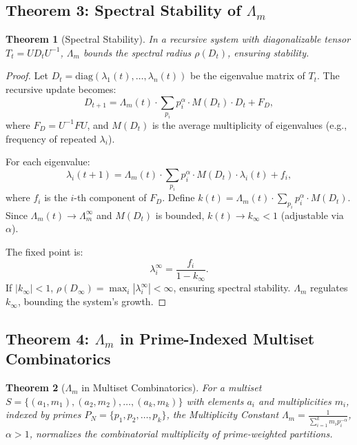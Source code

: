 \documentclass{article}
\theoremstyle{plain}
\newtheorem{theorem}{Theorem}
\begin{document}
\subsection{Theorem 3: Spectral Stability of \(\Lambda_m\)}
\begin{theorem}[Spectral Stability]
In a recursive system with diagonalizable tensor \( T_t = U D_t U^{-1} \), \(\Lambda_m\) bounds the spectral radius \(\rho(D_t)\), ensuring stability.
\end{theorem}

\begin{proof}
Let \( D_t = \text{diag}(\lambda_1(t), \ldots, \lambda_n(t)) \) be the eigenvalue matrix of \( T_t \). The recursive update becomes:
\[
D_{t+1} = \Lambda_m(t) \cdot \sum_{p_i} p_i^\alpha \cdot M(D_t) \cdot D_t + F_D,
\]
where \( F_D = U^{-1} F U \), and \( M(D_t) \) is the average multiplicity of eigenvalues (e.g., frequency of repeated \(\lambda_i\)).

For each eigenvalue:
\[
\lambda_i(t+1) = \Lambda_m(t) \cdot \sum_{p_i} p_i^\alpha \cdot M(D_t) \cdot \lambda_i(t) + f_i,
\]
where \( f_i \) is the \( i \)-th component of \( F_D \). Define \( k(t) = \Lambda_m(t) \cdot \sum_{p_i} p_i^\alpha \cdot M(D_t) \). Since \( \Lambda_m(t) \to \Lambda_m^\infty \) and \( M(D_t) \) is bounded, \( k(t) \to k_\infty < 1 \) (adjustable via \(\alpha\)).

The fixed point is:
\[
\lambda_i^\infty = \frac{f_i}{1 - k_\infty}.
\]
If \( |k_\infty| < 1 \), \(\rho(D_\infty) = \max_i |\lambda_i^\infty| < \infty\), ensuring spectral stability. \(\Lambda_m\) regulates \( k_\infty \), bounding the system’s growth.
\end{proof}

\subsection{Theorem 4: \(\Lambda_m\) in Prime-Indexed Multiset Combinatorics}
\begin{theorem}[\(\Lambda_m\) in Multiset Combinatorics]
For a multiset \( S = \{ (a_1, m_1), (a_2, m_2), \ldots, (a_k, m_k) \} \) with elements \( a_i \) and multiplicities \( m_i \), indexed by primes \( P_N = \{ p_1, p_2, \ldots, p_k \} \), the Multiplicity Constant \(\Lambda_m = \frac{1}{\sum_{i=1}^k m_i p_i^{-\alpha}}\), \(\alpha > 1\), normalizes the combinatorial multiplicity of prime-weighted partitions.
\end{theorem}
\end{document}
